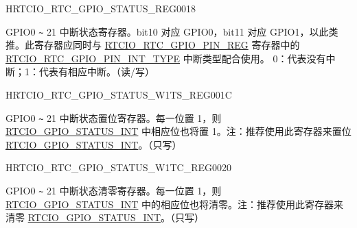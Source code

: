 \begin{register}{H}{RTCIO\_RTC\_GPIO\_STATUS\_REG}{\hexprefix{}0018}\label{regdesc:RTCIORTCGPIOSTATUSREG}
%
%
\regnewline%
\begin{regdesc}\begin{reglist}
\label{fielddesc:RTCIOGPIOSTATUSINT}\item [RTCIO\_GPIO\_STATUS\_INT] GPIO0 \verb+~+ 21 中断状态寄存器。bit10 对应 GPIO0，bit11 对应 GPIO1，以此类推。此寄存器应同时与 \hyperref[regdesc:RTCIORTCGPIOPINNREG]{RTCIO\_RTC\_GPIO\_PIN\_REG} 寄存器中的 \hyperref[fielddesc:RTCIOGPIOPINNINTTYPE]{RTCIO\_RTC\_GPIO\_PIN\_INT\_TYPE} 中断类型配合使用。
0：代表没有中断；1：代表有相应中断。（读/写）
\end{reglist}\end{regdesc}
\end{register}


\begin{register}{H}{RTCIO\_RTC\_GPIO\_STATUS\_W1TS\_REG}{\hexprefix{}001C}\label{regdesc:RTCIORTCGPIOSTATUSW1TSREG}
%
%
\regnewline%
\begin{regdesc}\begin{reglist}
\label{fielddesc:RTCIOGPIOSTATUSINTW1TS}\item [RTCIO\_GPIO\_STATUS\_INT\_W1TS] GPIO0 \verb+~+ 21 中断状态置位寄存器。每一位置 1，则 \hyperref[fielddesc:RTCIOGPIOSTATUSINT]{RTCIO\_GPIO\_STATUS\_INT} 中相应位也将置 1。注：推荐使用此寄存器来置位 \hyperref[fielddesc:RTCIOGPIOSTATUSINT]{RTCIO\_GPIO\_STATUS\_INT}。（只写）
\end{reglist}\end{regdesc}
\end{register}


\begin{register}{H}{RTCIO\_RTC\_GPIO\_STATUS\_W1TC\_REG}{\hexprefix{}0020}\label{regdesc:RTCIORTCGPIOSTATUSW1TCREG}
%
%
\regnewline%
\begin{regdesc}\begin{reglist}
\label{fielddesc:RTCIOGPIOSTATUSINTW1TC}\item [RTCIO\_GPIO\_STATUS\_INT\_W1TC] GPIO0 \verb+~+ 21 中断状态清零寄存器。每一位置 1，则 \hyperref[fielddesc:RTCIOGPIOSTATUSINT]{RTCIO\_GPIO\_STATUS\_INT} 中的相应位也将清零。注：推荐使用此寄存器来清零 \hyperref[fielddesc:RTCIOGPIOSTATUSINT]{RTCIO\_GPIO\_STATUS\_INT}。（只写）
\end{reglist}\end{regdesc}
\end{register}


